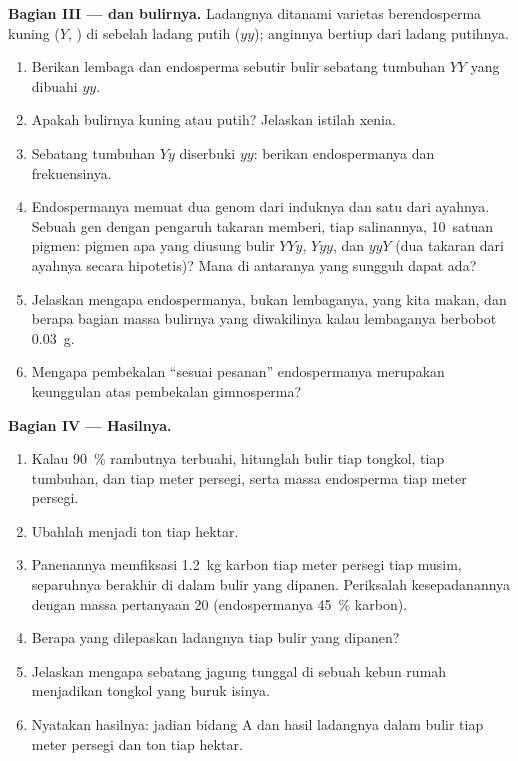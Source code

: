 \begin{problem}
\medskip
\noindent\textbf{Bagian III ---  dan bulirnya.}
Ladangnya ditanami varietas berendosperma kuning ($Y$, ) di
sebelah ladang putih ($yy$); anginnya bertiup dari ladang putihnya.
\begin{enumerate}[resume]
  \item Berikan  lembaga dan endosperma sebutir bulir sebatang
        tumbuhan $YY$ yang dibuahi  $yy$.
  \item Apakah bulirnya kuning atau putih? Jelaskan istilah xenia.
  \item Sebatang tumbuhan $Yy$ diserbuki  $yy$: berikan
         endospermanya dan frekuensinya.
  \item Endospermanya memuat dua genom dari induknya dan satu dari
        ayahnya. Sebuah gen dengan pengaruh takaran memberi, tiap
        salinannya, 10~satuan pigmen: pigmen apa yang diusung bulir
        $YYy$, $Yyy$, dan $yyY$ (dua takaran dari ayahnya secara
        hipotetis)? Mana di antaranya yang sungguh dapat ada?
  \item Jelaskan mengapa endospermanya, bukan lembaganya, yang kita
        makan, dan berapa bagian massa bulirnya yang diwakilinya kalau
        lembaganya berbobot \qty{0.03}{g}.
  \item Mengapa pembekalan ``sesuai pesanan'' endospermanya merupakan
        keunggulan atas pembekalan gimnosperma?
\end{enumerate}

\medskip
\noindent\textbf{Bagian IV --- Hasilnya.}
\begin{enumerate}[resume]
  \item Kalau \qty{90}{\%} rambutnya terbuahi, hitunglah bulir tiap
        tongkol, tiap tumbuhan, dan tiap meter persegi, serta massa
        endosperma tiap meter persegi.
  \item Ubahlah menjadi ton tiap hektar.
  \item Panenannya memfiksasi \qty{1.2}{kg} karbon tiap meter persegi
        tiap musim, separuhnya berakhir di dalam bulir yang dipanen.
        Periksalah kesepadanannya dengan massa pertanyaan 20
        (endospermanya \qty{45}{\%} karbon).
  \item Berapa  yang dilepaskan ladangnya tiap bulir
        yang dipanen?
  \item Jelaskan mengapa sebatang jagung tunggal di sebuah kebun rumah
        menjadikan tongkol yang buruk isinya.
  \item Nyatakan hasilnya: jadian  bidang A dan hasil ladangnya
        dalam bulir tiap meter persegi dan ton tiap hektar.
\end{enumerate}
\end{problem}
